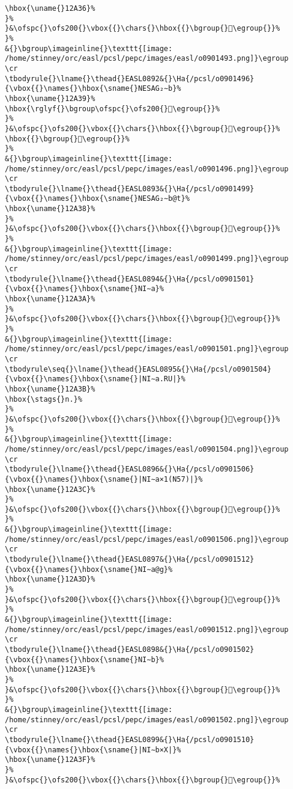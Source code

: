 \begin{verbatim}
\hbox{\uname{}12A36}%
}%
}&\ofspc{}\ofs200{}\vbox{{}\chars{}\hbox{{}\bgroup{}𒨶\egroup{}}%
}%
&{}\bgroup\imageinline{}\texttt{[image: /home/stinney/orc/easl/pcsl/pepc/images/easl/o0901493.png]}\egroup
\cr
\tbodyrule{}\lname{}\thead{}EASL0892&{}\Ha{/pcsl/o0901496}{\vbox{{}\names{}\hbox{\sname{}NESAG₂∼b}%
\hbox{\uname{}12A39}%
\hbox{\rglyf{}\bgroup\ofspc{}\ofs200{}𒨹\egroup{}}%
}%
}&\ofspc{}\ofs200{}\vbox{{}\chars{}\hbox{{}\bgroup{}𒨷\egroup{}}%
\hbox{{}\bgroup{}𒨹\egroup{}}%
}%
&{}\bgroup\imageinline{}\texttt{[image: /home/stinney/orc/easl/pcsl/pepc/images/easl/o0901496.png]}\egroup
\cr
\tbodyrule{}\lname{}\thead{}EASL0893&{}\Ha{/pcsl/o0901499}{\vbox{{}\names{}\hbox{\sname{}NESAG₂∼b@t}%
\hbox{\uname{}12A38}%
}%
}&\ofspc{}\ofs200{}\vbox{{}\chars{}\hbox{{}\bgroup{}𒨸\egroup{}}%
}%
&{}\bgroup\imageinline{}\texttt{[image: /home/stinney/orc/easl/pcsl/pepc/images/easl/o0901499.png]}\egroup
\cr
\tbodyrule{}\lname{}\thead{}EASL0894&{}\Ha{/pcsl/o0901501}{\vbox{{}\names{}\hbox{\sname{}NI∼a}%
\hbox{\uname{}12A3A}%
}%
}&\ofspc{}\ofs200{}\vbox{{}\chars{}\hbox{{}\bgroup{}𒨺\egroup{}}%
}%
&{}\bgroup\imageinline{}\texttt{[image: /home/stinney/orc/easl/pcsl/pepc/images/easl/o0901501.png]}\egroup
\cr
\tbodyrule\seq{}\lname{}\thead{}EASL0895&{}\Ha{/pcsl/o0901504}{\vbox{{}\names{}\hbox{\sname{}|NI∼a.RU|}%
\hbox{\uname{}12A3B}%
\hbox{\stags{}n.}%
}%
}&\ofspc{}\ofs200{}\vbox{{}\chars{}\hbox{{}\bgroup{}𒨻\egroup{}}%
}%
&{}\bgroup\imageinline{}\texttt{[image: /home/stinney/orc/easl/pcsl/pepc/images/easl/o0901504.png]}\egroup
\cr
\tbodyrule{}\lname{}\thead{}EASL0896&{}\Ha{/pcsl/o0901506}{\vbox{{}\names{}\hbox{\sname{}|NI∼a×1(N57)|}%
\hbox{\uname{}12A3C}%
}%
}&\ofspc{}\ofs200{}\vbox{{}\chars{}\hbox{{}\bgroup{}𒨼\egroup{}}%
}%
&{}\bgroup\imageinline{}\texttt{[image: /home/stinney/orc/easl/pcsl/pepc/images/easl/o0901506.png]}\egroup
\cr
\tbodyrule{}\lname{}\thead{}EASL0897&{}\Ha{/pcsl/o0901512}{\vbox{{}\names{}\hbox{\sname{}NI∼a@g}%
\hbox{\uname{}12A3D}%
}%
}&\ofspc{}\ofs200{}\vbox{{}\chars{}\hbox{{}\bgroup{}𒨽\egroup{}}%
}%
&{}\bgroup\imageinline{}\texttt{[image: /home/stinney/orc/easl/pcsl/pepc/images/easl/o0901512.png]}\egroup
\cr
\tbodyrule{}\lname{}\thead{}EASL0898&{}\Ha{/pcsl/o0901502}{\vbox{{}\names{}\hbox{\sname{}NI∼b}%
\hbox{\uname{}12A3E}%
}%
}&\ofspc{}\ofs200{}\vbox{{}\chars{}\hbox{{}\bgroup{}𒨾\egroup{}}%
}%
&{}\bgroup\imageinline{}\texttt{[image: /home/stinney/orc/easl/pcsl/pepc/images/easl/o0901502.png]}\egroup
\cr
\tbodyrule{}\lname{}\thead{}EASL0899&{}\Ha{/pcsl/o0901510}{\vbox{{}\names{}\hbox{\sname{}|NI∼b×X|}%
\hbox{\uname{}12A3F}%
}%
}&\ofspc{}\ofs200{}\vbox{{}\chars{}\hbox{{}\bgroup{}𒨿\egroup{}}%

\end{verbatim}

